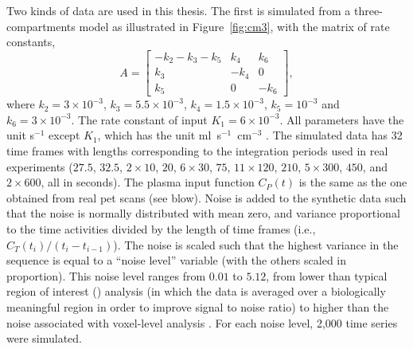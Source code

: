 Two kinds of data are used in this thesis. The first is simulated from a three-compartments model as illustrated in Figure~\ref{fig:cm3}, with the matrix of rate constants,
\begin{equation}
  A = \begin{bmatrix}
    - k_2 - k_3 - k_5 & k_4  & k_6 \\
    k_3               & -k_4 & 0   \\
    k_5               & 0    & -k_6
  \end{bmatrix},
\end{equation}
where $k_2 = 3 \times 10^{-3}$, $k_3 = 5.5 \times 10^{-3}$, $k_4 = 1.5 \times 10^{-3}$, $k_5 = 10^{-3}$ and $k_6 = 3 \times 10^{-3}$. The rate constant of input $K_1 = 6\times 10^{-3}$. All parameters have the unit s$^{-1}$ except $K_1$, which has the unit ml~s$^{-1}$~cm$^{-3}$ \cite{RLNomen}. The simulated data has 32 time frames with lengths corresponding to the integration periods used in real experiments ($27.5$, $32.5$, $2 \times 10$, $20$, $6 \times 30$, $75$, $11 \times 120$, $210$, $5 \times 300$, $450$, and $2 \times 600$, all in seconds). The plasma input function $C_P(t)$ is the same as the one obtained from real pet scans (see blow). Noise is added to the synthetic data such that the noise is normally distributed with mean zero, and variance proportional to the time activities divided by the length of time frames (i.e., $C_T(t_i)/(t_i - t_{i-1})$). The noise is scaled such that the highest variance in the sequence is equal to a ``noise level'' variable (with the others scaled in proportion). This noise level ranges from $0.01$ to $5.12$, from lower than typical region of interest (\roi) analysis (in which the data is averaged over a biologically meaningful region in order to improve signal to noise ratio) to higher than the noise associated with voxel-level analysis \citep{Peng:2008fx}. For each noise level, 2,000 time series were simulated.

